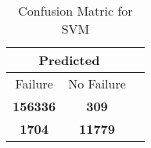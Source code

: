 \begin{table}[] 
\caption{Confusion Matric for SVM} 
\label{Table: Prediction Accuracy-NoneSVMSVMEKF-ignoreReflection-Reflection} 
\centering 
\begin{tabular} 
 {@{}ccc@{}} 
\toprule 
\multicolumn{2}{c}{\textbf{Predicted}}
 \\ \midrule 
\multicolumn{1}{|c|}{Failure} & 
\multicolumn{1}{c|}{No Failure}
 \\ \midrule 
\multicolumn{1}{|c|}{\color{green}\textbf{156336}} & 
\multicolumn{1}{c|}{\color{red}\textbf{309}}
 \\ \midrule 
\multicolumn{1}{|c|}{\color{red}\textbf{1704}} & 
\multicolumn{1}{c|}{\color{green}\textbf{11779}}
 \\ \bottomrule 
\end{tabular} 
\end{table} 
